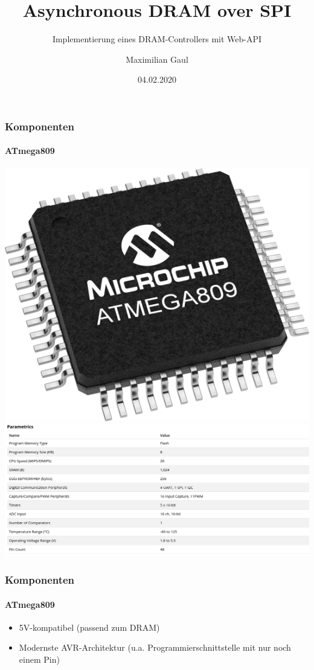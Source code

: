 \documentclass{beamer}
\title{Asynchronous DRAM over SPI}
\subtitle{Implementierung eines DRAM-Controllers mit Web-API}
\author{Maximilian Gaul}
\date{04.02.2020}
\begin{document}
	
\begin{frame}
	\titlepage
\end{frame}

\begin{frame}

	\frametitle{Komponenten}
	\framesubtitle{ATmega809}
	\begin{center}
		\includegraphics[scale=0.1125]{images/ATmega809.png}
		\includegraphics[scale=0.325]{images/ATMEGA809_peripherals.png}
	\end{center}

\end{frame}

\begin{frame}

	\frametitle{Komponenten}
	\framesubtitle{ATmega809}
	\begin{itemize}
		\item 5V-kompatibel (passend zum DRAM)
		\item Modernste AVR-Architektur (u.a. Programmierschnittstelle mit nur noch einem Pin)
	\end{itemize}

\end{frame}
\end{document}
